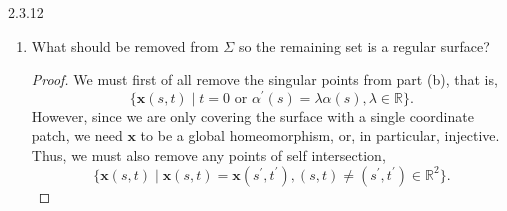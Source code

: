 \documentclass[11pt]{article}
\begin{document}
\begin{problem}{2.3.12}
\begin{enumerate}[label=(\alph*)]
\begin{proof}
            Note that this fails when \( t=0 \), that is, for all points \( p \in \mathbf{x}^{-1}(0) \) which map to the origin.
            The other singularities occur when
            \begin{align}
            \label{eq:8}
              &\alpha(s) \times \alpha^{\prime}(s) = 0 \\
              \Rightarrow \ &\alpha^{\prime}(s) = \lambda\alpha(s),
            \end{align}
            for some \( \lambda \in \mathbb{R} \).
          \end{proof}
		\item What should be removed from \(\Sigma\) so the remaining set is a regular surface?
          \begin{proof}
            We must first of all remove the singular points from part (b), that is,
            \begin{equation}
             \{ \mathbf{x}(s,t) \mid t = 0 \text{ or } \alpha^{\prime}(s) = \lambda\alpha(s), \lambda \in \mathbb{R} \}.
            \end{equation}
            However, since we are only covering the surface with a single coordinate patch, we need \( \mathbf{x} \) to be a global homeomorphism, or, in particular, injective.
            Thus, we must also remove any points of self intersection,
            \begin{equation}
            \label{eq:9}
            \{\mathbf{x}(s,t) \mid \mathbf{x}(s,t) = \mathbf{x}(s^{\prime}, t^{\prime}), (s, t) \neq (s^{\prime}, t^{\prime}) \in \mathbb{R}^2\}.
            \end{equation}
          \end{proof}
	\end{enumerate}
\end{problem}
\end{document}
